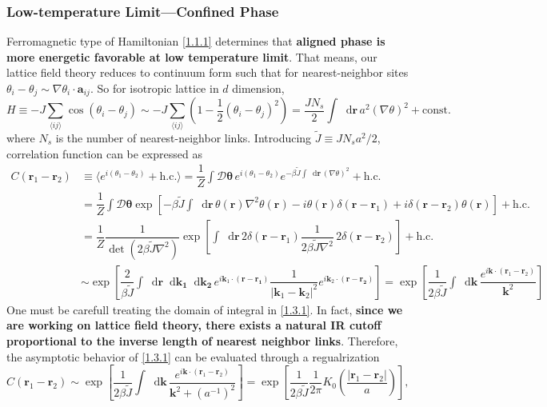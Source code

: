 \documentclass[10pt,nofootinbib]{revtex4}
\newcommand*\dd{\mathop{}\!\mathrm{d}}
\begin{document}
		\subsubsection{Low-temperature Limit---Confined Phase}
			Ferromagnetic type of Hamiltonian \eqref{1.1.1} determines that \textbf{aligned phase is more energetic favorable at low temperature limit}. That means, our lattice field theory reduces to continuum form such that for nearest-neighbor sites $\theta_i-\theta_j\sim\nabla\theta_i\cdot\bm{a}_{ij}$. So for isotropic lattice in $d$ dimension,
			\begin{equation*}
				H\equiv-J\sum_{\langle ij \rangle }\cos(\theta_i-\theta_j)\sim-J\sum_{\langle ij \rangle }\left(1-\dfrac{1}{2}(\theta_i-\theta_j)^2\right) =\dfrac{JN_s}{2}\int\dd\bm{r}\,a^2(\nabla\theta)^2+\text{const.}
			\end{equation*}
			where $N_s$ is the number of nearest-neighbor links. Introducing $\widetilde{J}\equiv JN_sa^2/2$, correlation function can be expressed as
			\begin{align}
				C(\bm{r}_1-\bm{r}_2)&\equiv\langle e^{i(\theta_1-\theta_2)}+\text{h.c.}\rangle=\dfrac{1}{Z}\int\mathcal{D}\bm{\theta}\,e^{i(\theta_1-\theta_2)}e^{-\beta \widetilde{J}\int\dd\bm{r}\,(\nabla\theta)^2 }+\text{h.c.}\nonumber\\
				&=\dfrac{1}{Z}\int\mathcal{D}\bm{\theta}\exp \left[-\beta \widetilde{J}\int\dd\bm{r}\,\theta(\bm{r})\nabla^2\theta(\bm{r})-i\theta(\bm{r})\delta(\bm{r}-\bm{r}_1)+i\delta(\bm{r}-\bm{r}_2)\theta(\bm{r})\right]+\text{h.c.}\nonumber\\
				&=\dfrac{1}{Z}\dfrac{1}{\det(2\beta \widetilde{J} \nabla^2)}\exp \left[\int\dd\bm{r}\,2\delta(\bm{r}-\bm{r}_1)\dfrac{1}{2\beta \widetilde{J}\nabla^2}\,2\delta(\bm{r}-\bm{r}_2)\right]+\text{h.c.}\nonumber\\
				&\sim\exp \left[\dfrac{2}{\beta \widetilde{J}}\int\dd\bm{r}\dd\bm{k_1}\dd\bm{k_2}\,e^{i\bm{k}_1\cdot(\bm{r}-\bm{r_1})}\dfrac{1}{|\bm{k}_1-\bm{k}_2|^2}e^{i\bm{k}_2\cdot(\bm{r}-\bm{r_2})}\right]=\exp \left[\dfrac{1}{2\beta \widetilde{J}}\int\dd\bm{k}\,\dfrac{e^{i\bm{k}\cdot(\bm{r}_1-\bm{r}_2)}}{\bm{k}^2}\right] \label{1.3.1}
			\end{align}
			One must be carefull treating the domain of integral in \eqref{1.3.1}. In fact, \textbf{since we are working on lattice field theory, there exists a natural IR cutoff proportional to the inverse length of nearest neighbor links}. Therefore, the asymptotic behavior of \eqref{1.3.1} can be evaluated through a regualrization 
			\begin{equation}\label{1.3.2}
				C(\bm{r}_1-\bm{r}_2)\sim\exp \left[\dfrac{1}{2\beta \widetilde{J}}\int\dd\bm{k}\,\dfrac{e^{i\bm{k}\cdot(\bm{r}_1-\bm{r}_2)}}{\bm{k}^2+(a^{-1})^2}\right]=\exp\left[\dfrac{1}{2\beta \widetilde{J} }\dfrac{1}{2\pi}K_0\left(\dfrac{|\bm{r}_1-\bm{r}_2|}{a}\right)\right],
			\end{equation}
\end{document}
